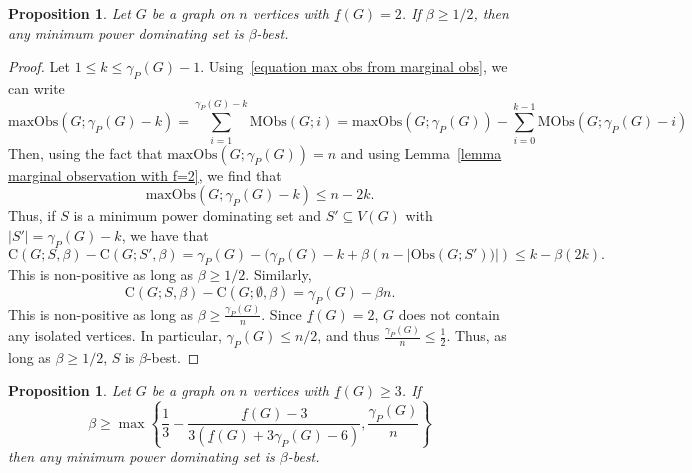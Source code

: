 \documentclass{article}
\newtheorem{proposition}[theorem]{Proposition}
\begin{document}
        \begin{proposition}\label{proposition f = 2 beta bound for gamma sensors}
            Let $G$ be a graph on $n$ vertices with $\underline{f}(G)=2$.
            If $\beta\geq 1/2$, then any minimum power dominating set is $\beta$-best.
        \end{proposition}
        \begin{proof}
            Let $1\leq k\leq \gamma_P(G)-1$.
            Using~\eqref{equation max obs from marginal obs}, we can write 
                \[ \mathrm{maxObs}(G;\gamma_P(G)-k)=\sum_{i=1}^{\gamma_P(G)-k}\mathrm{MObs}(G;i)=\mathrm{maxObs}(G;\gamma_P(G))-\sum_{i=0}^{k-1}\mathrm{MObs}(G;\gamma_P(G)-i) \]
            Then, using the fact that $\mathrm{maxObs}(G;\gamma_P(G))=n$ and using Lemma~\ref{lemma marginal observation with f=2}, we find that
                \[ \mathrm{maxObs}(G;\gamma_P(G)-k)\leq n-2k. \]
            Thus, if $S$ is a minimum power dominating set and $S'\subseteq V(G)$ with $|S'|=\gamma_P(G)-k$, we have that
                \[ \mathrm{C}(G;S,\beta)-\mathrm{C}(G;S',\beta)=\gamma_P(G)-(\gamma_P(G)-k+\beta(n-|\mathrm{Obs}(G;S'))|)\leq k-\beta(2k). \]
            This is non-positive as long as $\beta\geq 1/2$.
            Similarly, 
                \[ \mathrm{C}(G;S,\beta)-\mathrm{C}(G;\emptyset,\beta)=\gamma_P(G)-\beta n. \]
            This is non-positive as long as $\beta\geq \frac{\gamma_P(G)}{n}$.
            Since $\underline{f}(G)=2$, $G$ does not contain any isolated vertices.
            In particular, $\gamma_P(G)\leq n/2$, and thus $\frac{\gamma_P(G)}{n}\leq \frac{1}{2}$.
            Thus, as long as $\beta\geq 1/2$, $S$ is $\beta$-best.
        \end{proof}
        \begin{proposition}\label{proposition f geq 3 beta bound for gamma sensors}
            Let $G$ be a graph on $n$ vertices with $\underline{f}(G)\geq 3$.
            If
                \[ \beta\geq\max\left\{\frac{1}{3}-\frac{\underline{f}(G)-3}{3(\underline{f}(G)+3\gamma_P(G)-6)},\frac{\gamma_P(G)}{n}\right\} \]
            then any minimum power dominating set is $\beta$-best.
        \end{proposition}
\end{document}
